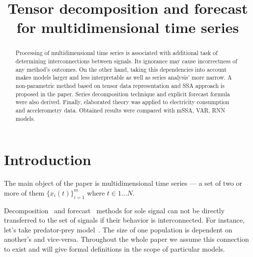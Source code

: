\documentclass[referee, pdflatex]{sn-jnl}
\theoremstyle{definition}
\theoremstyle{plain}
\begin{document}
	
	\title{Tensor decomposition and forecast for multidimensional time series}
	
	\author*[1]{ }
	\author*[2]{ }
	
	
	
	\maketitle
	
	\begin{abstract}
		
		Processing of multidimensional time series is associated with additional task of determining interconnections between signals. Its ignorance may cause incorrectness of any method's outcomes. On the other hand, taking this dependencies into account makes models larger and less interpretable as well as series analysis' more narrow. A non-parametric method based on tensor data representation and SSA approach is proposed in the paper. Series decomposition technique and explicit forecast formula were also derived. Finally, elaborated theory was applied to electricity consumption and accelerometry data. Obtained results were compared with mSSA, VAR, RNN models.
		
	\end{abstract}
	
	\section{Introduction}\label{Intro}
	
	The main object of the paper is multidimensional time series --- a set of two or more of them $ \{x_i(t)\}_{i=1}^m $ where $ t \in 1 \ldots N $. %
	
	Decomposition~\cite{enders2010applied, x11, cleveland90} and forecast~\cite{3b1355aedd1041f1853e609a410576f3, enders2010applied, Box_Jenkins_methodology, motrenko2022continuous} methods for sole signal can not be directly transferred to the set of signals if their behavior is interconnected. For instance, let's take predator-prey model~\cite{Volterra:1928}. The size of one population is dependent on another's and vice-versa. Throughout the whole paper we assume this connection to exist and will give formal definitions in the scope of particular models. 
	
\end{document}
